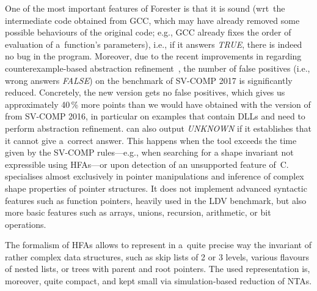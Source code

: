 One of the most important features of Forester is that it is sound
(wrt~the intermediate code obtained from GCC, which may have already
removed some possible behaviours of the original code; e.g.,
GCC already fixes the order of evaluation of a~function's parameters),
i.e., if it answers \emph{TRUE}, there is indeed no bug in the program.
Moreover, due to the recent improvements in \forester{} regarding counterexample-based
abstraction refinement~\cite{vmcai17}, the number of false positives (i.e.,
wrong answers \emph{FALSE}) on the benchmark of SV-COMP 2017 is
significantly reduced.
Concretely, the new version gets no false positives, which gives us
approximately 40\,\% more points than we would have obtained with the version
of \forester{} from SV-COMP 2016, in particular on examples that contain
DLLs and need to perform abstraction refinement.
\forester{} can also output \emph{UNKNOWN} if it
%
establishes that it cannot give a~correct answer. 
This happens when the tool exceeds the time given by the SV-COMP rules---e.g.,
when searching for a shape invariant not expressible using HFAs---or upon detection of an
unsupported feature of~C. 
\forester{} specialises almost exclusively in pointer manipulations and inference of complex shape properties of pointer structures.
It does not implement advanced syntactic features such as function pointers, heavily used in the LDV
benchmark, but also more basic features such as arrays, unions, recursion, arithmetic, or bit operations.

The formalism of HFAs allows \forester{} to represent in a~quite precise way the
invariant of rather complex data structures, such as skip lists of 2 or 3
levels, various flavours of nested lists, or trees with parent and root
pointers.  The used representation is, moreover, quite compact, and kept small
via simulation-based reduction of NTAs.


